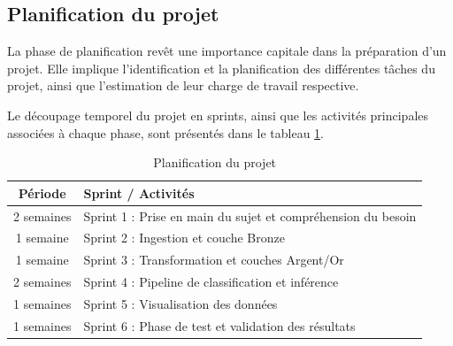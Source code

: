 

\subsection{Planification du projet}
La phase de planification revêt une importance capitale dans la préparation d’un projet. Elle implique l’identification et la planification des différentes tâches du projet, ainsi que l’estimation de leur charge de travail respective. 

Le découpage temporel du projet en sprints, ainsi que les activités principales associées à chaque phase, sont présentés dans le tableau \ref{tab:planification}.

\begin{table}[h!]
\centering
\begin{tabularx}{\textwidth}{|c|X|}
  \hline
  \textbf{Période} & \textbf{Sprint / Activités} \\
  \hline
  2 semaines & Sprint 1 : Prise en main du sujet et compréhension du besoin  \\
  \hline
  1 semaine & Sprint 2 : Ingestion et couche Bronze \\
  \hline
  1 semaine & Sprint 3 : Transformation et couches Argent/Or  \\
  \hline
  2 semaines & Sprint 4 : Pipeline de classification et inférence  \\
  \hline
  1 semaines & Sprint 5 : Visualisation des données  \\
  \hline
  1 semaines & Sprint 6 : Phase de test et validation des résultats \\
  \hline
\end{tabularx}
\caption{Planification du projet}
\label{tab:planification}
\end{table}

